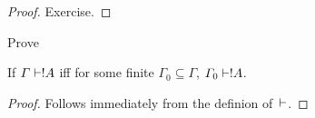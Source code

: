 \documentclass[../../include/open-logic-section]{subfiles}
\begin{document}
\begin{proof}
Exercise.
\end{proof}

\begin{prob}
Prove 
\end{prob}

\begin{prop}
If $\Gamma \Proves !A$ iff for some finite $\Gamma_0 \subseteq
\Gamma$, $\Gamma_0 \Proves !A$.
\end{prop}

\begin{proof}
Follows immediately from the definion of~$\Proves$.
\end{proof}
\end{document}
